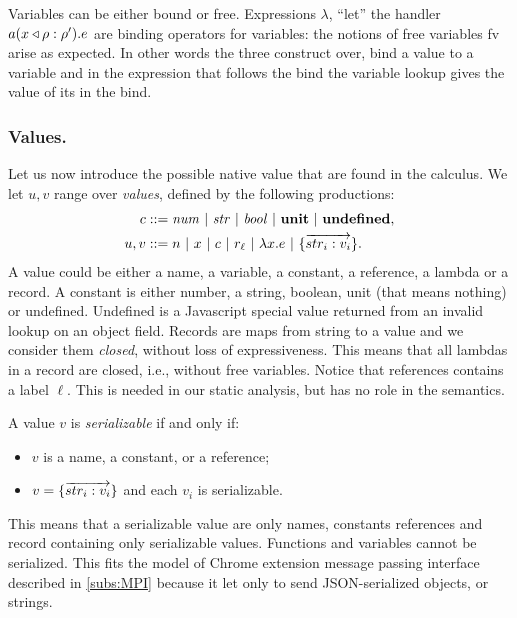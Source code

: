 Variables can be either bound or free. Expressions  $\lambda$, ``let'' the handler $\handler{a}{x}{\rho}{e}{\rho'}$ are binding operators for variables: the notions of free variables fv arise as expected. In other words the three construct over, bind a value to a variable and in the expression that follows the bind the variable lookup gives the value of its in the bind. 

\subsubsection{Values.}
Let us now introduce the possible native value that are found in the calculus.
We let $u,v$ range over \emph{values}, defined by the following productions:
\begin{align*}
c & ::= \mathit{num} ~|~ \mathit{str} ~|~ \mathit{bool} ~|~ \unit ~|~ \undef, \\
u,v &::= n ~|~ x ~|~ c ~|~ r_{\ell} ~|~ \lam{x}{e} ~|~ \rec{\vec{str_i:v_i}}.
\end{align*}
A value could be either a name, a variable, a constant, a reference, a lambda or a record. A constant is either number, a string, boolean, unit (that means nothing) or undefined. Undefined is a Javascript special value returned from an invalid lookup on an object field. Records are maps from string to a value and we consider them \emph{closed}, without loss of expressiveness. This means that all lambdas in a record are closed, i.e., without free variables. Notice that references contains a label $\ell$. This is needed in our static analysis, but has no role in the semantics.

\begin{definition}
\label{def:serializable}
A value $v$ is \emph{serializable} if and only if:
\begin{itemize}
\item $v$ is a name, a constant, or a reference;
\item $v = \rec{\vec{str_i:v_i}}$ and each $v_i$ is serializable.
\end{itemize}
\end{definition}
This means that a serializable value are only names, constants references and record containing only serializable values. Functions and variables cannot be serialized. This fits the model of Chrome extension message passing interface described in \ref{subs:MPI} because it let only to send JSON-serialized objects, or strings.

